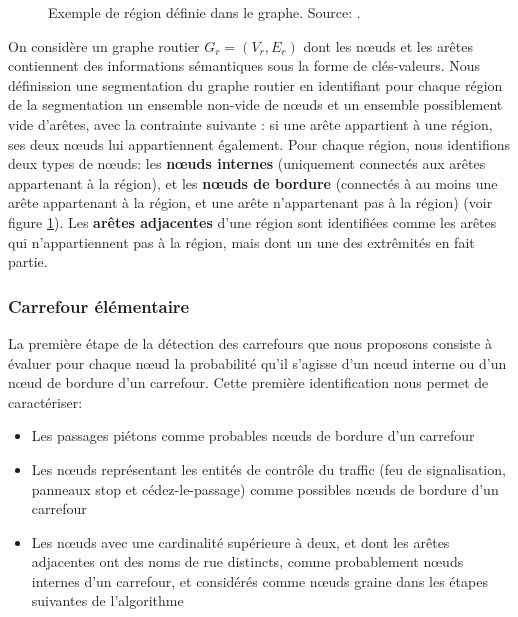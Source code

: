 \begin{figure}
    \centering
    \caption{Exemple de région définie dans le graphe. Source: \cite{Favreau2022}.}
    \label{fig:modelisation_region_segmentation}
\end{figure}

On considère un graphe routier $G_r = (V_r,E_r)$ dont les nœuds et les arêtes contiennent des informations sémantiques sous la forme de clés-valeurs. Nous définission une segmentation du graphe routier en identifiant pour chaque région de la segmentation un ensemble non-vide de nœuds et un ensemble possiblement vide d'arêtes, avec la contrainte suivante : si une arête appartient à une région, ses deux nœuds lui appartiennent également.
Pour chaque région, nous identifions deux types de nœuds: les \textbf{nœuds internes} (uniquement connectés aux arêtes appartenant à la région), et les \textbf{nœuds de bordure} (connectés à au moins une arête appartenant à la région, et une arête n'appartenant pas à la région) (voir figure \ref{fig:modelisation_region_segmentation}).
Les \textbf{arêtes adjacentes} d'une région sont identifiées comme les arêtes qui n'appartiennent pas à la région, mais dont un une des extrêmités en fait partie.

\subsubsection{Carrefour élémentaire}

La première étape de la détection des carrefours que nous proposons consiste à évaluer pour chaque nœud la probabilité qu'il s'agisse d'un nœud interne ou d'un nœud de bordure d'un carrefour.
Cette première identification nous permet de caractériser:

\begin{itemize}
    \item Les passages piétons comme probables nœuds de bordure d'un carrefour
    \item Les nœuds représentant les entités de contrôle du traffic (feu de signalisation, panneaux stop et cédez-le-passage) comme possibles nœuds de bordure d'un carrefour
    \item Les nœuds avec une cardinalité supérieure à deux, et dont les arêtes adjacentes ont des noms de rue distincts, comme probablement nœuds internes d'un carrefour, et considérés comme nœuds graine dans les étapes suivantes de l'algorithme
\end{itemize}

